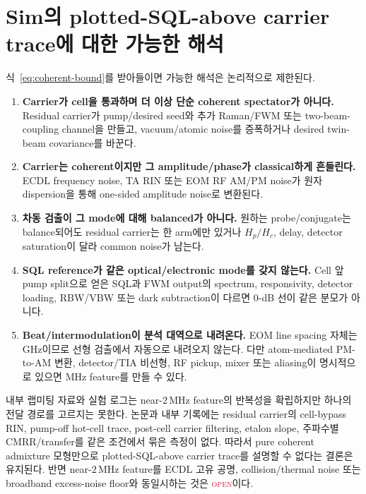 \documentclass[11pt,a4paper]{article}
\newcommand{\MHz}{\,\mathrm{MHz}}
\newcommand{\status}[1]{\textsc{#1}}
\newcommand{\openclaim}{\textcolor{crimson}{\status{open}}}
\begin{document}
\section{Sim의 plotted-SQL-above carrier trace에 대한 가능한 해석}

식~\eqref{eq:coherent-bound}를 받아들이면 가능한 해석은 논리적으로 제한된다.
\begin{enumerate}
\item \textbf{Carrier가 cell을 통과하며 더 이상 단순 coherent spectator가 아니다.}
Residual carrier가 pump/desired seed와 추가 Raman/FWM 또는 two-beam-coupling channel을
만들고, vacuum/atomic noise를 증폭하거나 desired twin-beam covariance를 바꾼다.
\item \textbf{Carrier는 coherent이지만 그 amplitude/phase가 classical하게 흔들린다.}
ECDL frequency noise, TA RIN 또는 EOM RF AM/PM noise가 원자 dispersion을 통해
one-sided amplitude noise로 변환된다.
\item \textbf{차동 검출이 그 mode에 대해 balanced가 아니다.}
원하는 probe/conjugate는 balance되어도 residual carrier는 한 arm에만 있거나
$H_p/H_c$, delay, detector saturation이 달라 common noise가 남는다.
\item \textbf{SQL reference가 같은 optical/electronic mode를 갖지 않는다.}
Cell 앞 pump split으로 얻은 SQL과 FWM output의 spectrum, responsivity, detector loading,
RBW/VBW 또는 dark subtraction이 다르면 0-dB 선이 같은 분모가 아니다.
\item \textbf{Beat/intermodulation이 분석 대역으로 내려온다.}
EOM line spacing 자체는 GHz이므로 선형 검출에서 자동으로 내려오지 않는다. 다만
atom-mediated PM-to-AM 변환, detector/TIA 비선형, RF pickup, mixer 또는 aliasing이
명시적으로 있으면 MHz feature를 만들 수 있다.
\end{enumerate}

내부 랩미팅 자료와 실험 로그는 near-$2\MHz$ feature의 반복성을 확립하지만 하나의
전달 경로를 고르지는 못한다. 논문과 내부 기록에는 residual carrier의 cell-bypass
RIN, pump-off hot-cell trace, post-cell carrier filtering, etalon slope, 주파수별
CMRR/transfer를 같은 조건에서 묶은 측정이 없다. 따라서 pure coherent admixture
모형만으로 plotted-SQL-above carrier trace를 설명할 수 없다는 결론은 유지된다.
반면 near-$2\MHz$ feature를 ECDL 고유 공명, collision/thermal noise 또는 broadband
excess-noise floor와 동일시하는 것은 \openclaim 이다.

\end{document}
